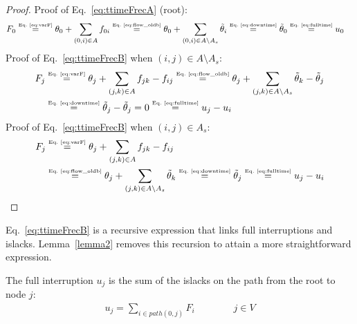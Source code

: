 \begin{proof}
    Proof of Eq.~\eqref{eq:ttimeFrecA} (root):
    \begin{align}
	    \displaystyle
	    F_0 &\stackrel{\mbox{\tiny Eq.~\ref{eq:varF}}}{=} \theta_0 + \sum_{(0,i) \in A}{f_{0i}} \stackrel{\mbox{\tiny Eq.~\ref{eq:flow_oldb}}}{=} \theta_0 + \sum_{(0,i) \in A \setminus A_{s}}{\tilde{\theta}_{i}} \stackrel{\mbox{\tiny Eq.~\ref{eq:downtime}}}{=} \tilde{\theta}_{0} \stackrel{\mbox{\tiny Eq.~\ref{eq:fulltime}}}{=} u_0 \nonumber
    \end{align}
    Proof of Eq.~\eqref{eq:ttimeFrecB} when $(i,j) \in A \setminus A_{s}$:
    \begin{align}  
	    \displaystyle
	    F_j &\stackrel{\mbox{\tiny Eq.~\ref{eq:varF}}}{=} \displaystyle \theta_j + \sum_{(j,k) \in A}{f_{jk}} - f_{ij} \stackrel{\mbox{\tiny Eq.~\ref{eq:flow_oldb}}}{=} \theta_j +\sum_{(j,k) \in A \setminus A_{s}}{\tilde{\theta}_{k}} - \tilde{\theta}_{j} \nonumber \\
	    &\stackrel{\mbox{\tiny Eq.~\ref{eq:downtime}}}{=} \tilde{\theta}_{j} - \tilde{\theta}_{j} = 0 \stackrel{\mbox{\tiny Eq.~\ref{eq:fulltime}}}{=} u_j - u_i \nonumber	
    \end{align}
    Proof of Eq.~\eqref{eq:ttimeFrecB} when $(i,j) \in A_{s}$:
    \begin{align}  
	    \displaystyle
        F_j &\stackrel{\mbox{\tiny Eq.~\ref{eq:varF}}}{=} \displaystyle \theta_j + \sum_{(j,k) \in A}{f_{jk}} - f_{ij} \nonumber  \\
        &\stackrel{\mbox{\tiny Eq.~\ref{eq:flow_oldb}}}{=} \theta_j +\sum_{(j,k) \in A \setminus A_{s}}{\tilde{\theta}_{k}} \stackrel{\mbox{\tiny Eq.~\ref{eq:downtime}}}{=} \tilde{\theta}_{j} \stackrel{\mbox{\tiny Eq.~\ref{eq:fulltime}}}{=} u_j - u_i \nonumber
    \end{align}
\end{proof}

Eq.~\eqref{eq:ttimeFrecB} is a recursive expression that links full interruptions and islacks. Lemma~\ref{lemma2} removes this recursion to attain a more straightforward expression.

\begin{lemma} \label{lemma2}
	The full interruption $u_j$ is the sum of the islacks on the path from the root to node $j$:
	\begin{align} \label{eq:ttimeF2}
		\displaystyle u_j = \sum_{i \in path(0,j)}{F_i} \qquad \qquad j \in V
	\end{align}
\end{lemma}

